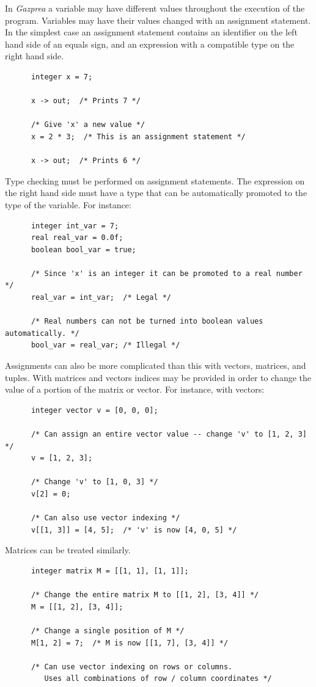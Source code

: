 \documentclass{article}
\begin{document}
    In \textit{Gazprea} a variable may have different values throughout the execution of the program. Variables may
    have their values changed with an assignment statement. In the simplest case an assignment statement contains an
    identifier on the left hand side of an equals sign, and an expression with a compatible type on the right hand
    side.

    \begin{lstlisting}
      integer x = 7;

      x -> out;  /* Prints 7 */

      /* Give 'x' a new value */
      x = 2 * 3;  /* This is an assignment statement */

      x -> out;  /* Prints 6 */
    \end{lstlisting}

    Type checking must be performed on assignment statements. The expression on the right hand side must have a type
    that can be automatically promoted to the type of the variable. For instance:

    \begin{lstlisting}
      integer int_var = 7;
      real real_var = 0.0f;
      boolean bool_var = true;

      /* Since 'x' is an integer it can be promoted to a real number */
      real_var = int_var;  /* Legal */

      /* Real numbers can not be turned into boolean values automatically. */
      bool_var = real_var; /* Illegal */
    \end{lstlisting}

    Assignments can also be more complicated than this with vectors, matrices, and tuples. With matrices and vectors
    indices may be provided in order to change the value of a portion of the matrix or vector. For instance, with
    vectors:

    \begin{lstlisting}
      integer vector v = [0, 0, 0];

      /* Can assign an entire vector value -- change 'v' to [1, 2, 3] */
      v = [1, 2, 3];

      /* Change 'v' to [1, 0, 3] */
      v[2] = 0;

      /* Can also use vector indexing */
      v[[1, 3]] = [4, 5];  /* 'v' is now [4, 0, 5] */
    \end{lstlisting}

    Matrices can be treated similarly.

    \begin{lstlisting}
      integer matrix M = [[1, 1], [1, 1]];

      /* Change the entire matrix M to [[1, 2], [3, 4]] */
      M = [[1, 2], [3, 4]];

      /* Change a single position of M */
      M[1, 2] = 7;  /* M is now [[1, 7], [3, 4]] */

      /* Can use vector indexing on rows or columns.
         Uses all combinations of row / column coordinates */
    \end{lstlisting}
\end{document}
